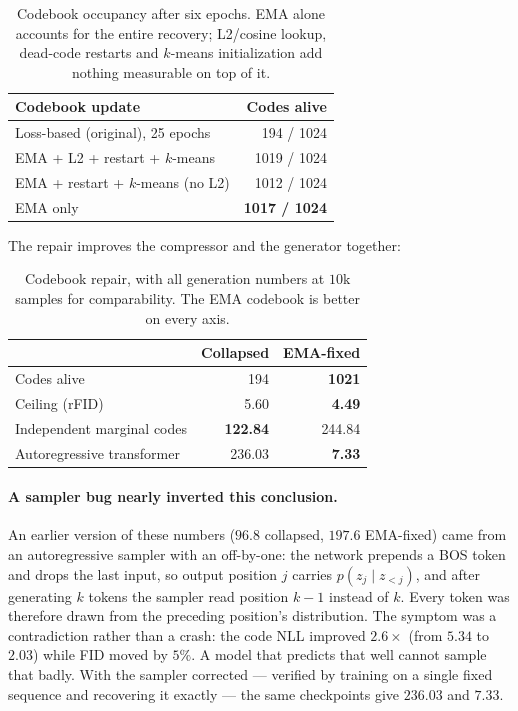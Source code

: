 \documentclass[sigconf,nonacm]{acmart}
\newcommand{\best}[1]{\textbf{#1}}
\begin{document}
\begin{table}[h]
\caption{Codebook occupancy after six epochs. EMA alone accounts for the entire
recovery; L2/cosine lookup, dead-code restarts and $k$-means initialization add
nothing measurable on top of it.}
\label{tab:vqabl}
\small
\begin{tabular}{lr}
\toprule
Codebook update & Codes alive \\
\midrule
Loss-based (original), 25 epochs        & 194 / 1024 \\
EMA + L2 + restart + $k$-means          & 1019 / 1024 \\
EMA + restart + $k$-means (no L2)       & 1012 / 1024 \\
EMA only                                & \best{1017 / 1024} \\
\bottomrule
\end{tabular}
\end{table}

The repair improves the compressor and the generator together:

\begin{table}[h]
\caption{Codebook repair, with all generation numbers at $10$k samples for
comparability. The EMA codebook is better on every axis.}
\small
\begin{tabular}{lrr}
\toprule
 & Collapsed & EMA-fixed \\
\midrule
Codes alive                    & 194    & \best{1021} \\
Ceiling (rFID)                 & 5.60   & \best{4.49} \\
Independent marginal codes     & \best{122.84} & 244.84 \\
Autoregressive transformer     & 236.03 & \best{7.33} \\
\bottomrule
\end{tabular}
\end{table}

\paragraph{A sampler bug nearly inverted this conclusion.}
An earlier version of these numbers ($96.8$ collapsed, $197.6$ EMA-fixed) came
from an autoregressive sampler with an off-by-one: the network prepends a BOS
token and drops the last input, so output position $j$ carries
$p(z_j \mid z_{<j})$, and after generating $k$ tokens the sampler read position
$k-1$ instead of $k$. Every token was therefore drawn from the preceding
position's distribution. The symptom was a contradiction rather than a crash:
the code NLL improved $2.6\times$ (from $5.34$ to $2.03$) while FID moved by
$5\%$. A model that predicts that well cannot sample that badly. With the
sampler corrected --- verified by training on a single fixed sequence and
recovering it exactly --- the same checkpoints give $236.03$ and $7.33$.
\end{document}

